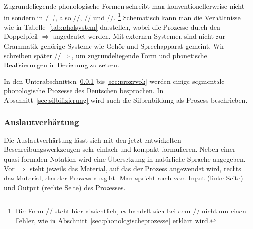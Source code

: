 Zugrundeliegende phonologische Formen schreibt man konventionellerweise nicht in \textipa{[~]} sondern in /~/, also \zB //, // und //.%
\footnote{Die Form // steht hier absichtlich, es handelt sich bei dem // nicht um einen Fehler, wie in Abschnitt~\ref{sec:phonologischeprozesse} erklärt wird.}
Schematisch kann man die Verhältnisse wie in Tabelle~\ref{tab:pholsystem} darstellen, wobei die Prozesse durch den Doppelpfeil $\Rightarrow$ angedeutet werden.
Mit externen Systemen sind nicht zur Grammatik gehörige Systeme wie Gehör und Sprechapparat gemeint.
Wir schreiben später //$\Rightarrow$\textipa{[ba:t]}, um zugrundeliegende Form und phonetische Realisierungen in Beziehung zu setzen.

\begin{table}
  \caption{Lexikon, Phonologie und Phonetik}
  \label{tab:pholsystem}
\end{table}

In den Unterabschnitten~\ref{sec:prozauslautverh} bis \ref{sec:prozrvok} werden einige segmentale phonologische Prozesse des Deutschen besprochen.
In Abschnitt~\ref{sec:silbifizierung} wird auch die Silbenbildung als Prozess beschrieben.

\subsubsection{Auslautverhärtung}

\label{sec:prozauslautverh}

Die Auslautverhärtung lässt sich mit den jetzt entwickelten Beschreibungswerkzeugen sehr einfach und kompakt formulieren.
Neben einer quasi-formalen Notation wird eine Übersetzung in natürliche Sprache angegeben.
Vor $\Rightarrow$ steht jeweils das Material, auf das der Prozess angewendet wird, rechts das Material, das der Prozess ausgibt.
Man spricht auch vom Input (linke Seite) und Output (rechte Seite) des Prozesses.

